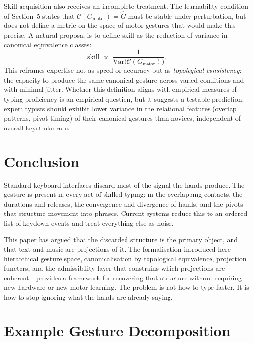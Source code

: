 \documentclass[11pt, a4paper]{article}
\begin{document}
Skill acquisition also receives an incomplete treatment. The learnability
condition of Section~5 states that $\mathcal{C}(G_{\mathrm{motor}}) =
\hat{G}$ must be stable under perturbation, but does not define a metric
on the space of motor gestures that would make this precise. A natural
proposal is to define skill as the reduction of variance in canonical
equivalence classes:
\[
  \mathrm{skill} \;\propto\; \frac{1}{\mathrm{Var}\bigl(\mathcal{C}(G_{\mathrm{motor}})\bigr)}.
\]
This reframes expertise not as speed or accuracy but as
\emph{topological consistency}: the capacity to produce the same
canonical gesture across varied conditions and with minimal jitter.
Whether this definition aligns with empirical measures of typing
proficiency is an empirical question, but it suggests a testable
prediction: expert typists should exhibit lower variance in the relational
features (overlap patterns, pivot timing) of their canonical gestures
than novices, independent of overall keystroke rate.

\section{Conclusion}

Standard keyboard interfaces discard most of the signal the hands
produce. The gesture is present in every act of skilled typing: in the
overlapping contacts, the durations and releases, the convergence and
divergence of hands, and the pivots that structure movement into
phrases. Current systems reduce this to an ordered list of keydown events
and treat everything else as noise.

This paper has argued that the discarded structure is the primary object,
and that text and music are projections of it. The formalisation
introduced here---hierarchical gesture space, canonicalisation by
topological equivalence, projection functors, and the admissibility layer
that constrains which projections are coherent---provides a framework for
recovering that structure without requiring new hardware or new motor
learning. The problem is not how to type faster. It is how to stop
ignoring what the hands are already saying.

\appendix
\section{Example Gesture Decomposition}
\end{document}
